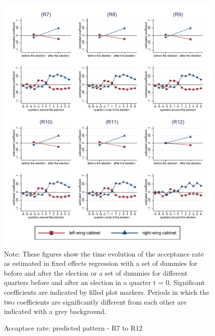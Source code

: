 \documentclass[11pt,a4paper]{scrartcl}
\begin{document}
\clearpage
\FloatBarrier



\clearpage
\FloatBarrier






\clearpage
\FloatBarrier


\clearpage
\FloatBarrier
\begin{figure}[!ht]
	\caption{Accaptace rate: predicted pattern - R7 to R12}
	\includegraphics[width=1\textwidth]{../results/decisions/acceptance_rate_graphs_R7-R12.pdf}
	\scriptsize{Note: These figures show the time evolution of the acceptance rate as estimated in fixed effects regression with a set of dummies for before and after the election or a set of dummies for different quarters before and after an election in a quarter t = 0. Significant coefficients are indicated by filled plot markers. Periods in which the two coefficients are significantly different from each other are indicated with a grey background.}
\end{figure}
\end{document}
